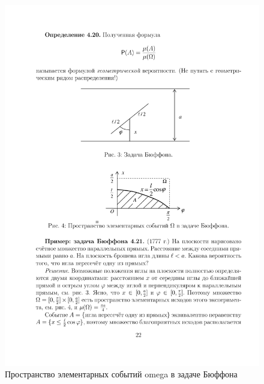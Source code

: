 \begin{figure}[H]
	\centering
	\includegraphics[]{pic/pic4}
	\caption{Пространство элементарных событий omega в задаче Бюффона}
	\label{fig4}
\end{figure}

